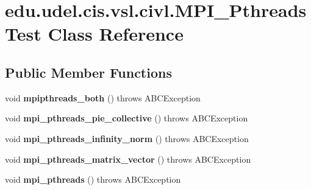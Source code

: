\hypertarget{classedu_1_1udel_1_1cis_1_1vsl_1_1civl_1_1MPI__PthreadsTest}{}\section{edu.\+udel.\+cis.\+vsl.\+civl.\+M\+P\+I\+\_\+\+Pthreads\+Test Class Reference}
\label{classedu_1_1udel_1_1cis_1_1vsl_1_1civl_1_1MPI__PthreadsTest}
\subsection*{Public Member Functions}
\begin{DoxyCompactItemize}
\item 
\hypertarget{classedu_1_1udel_1_1cis_1_1vsl_1_1civl_1_1MPI__PthreadsTest_aefea12f1eb79b9b60e9c1efc56e483ac}{}void {\bfseries mpipthreads\+\_\+both} ()  throws A\+B\+C\+Exception \label{classedu_1_1udel_1_1cis_1_1vsl_1_1civl_1_1MPI__PthreadsTest_aefea12f1eb79b9b60e9c1efc56e483ac}

\item 
\hypertarget{classedu_1_1udel_1_1cis_1_1vsl_1_1civl_1_1MPI__PthreadsTest_a29e435ffef9eee64615ddf6186b0dad7}{}void {\bfseries mpi\+\_\+pthreads\+\_\+pie\+\_\+collective} ()  throws A\+B\+C\+Exception \label{classedu_1_1udel_1_1cis_1_1vsl_1_1civl_1_1MPI__PthreadsTest_a29e435ffef9eee64615ddf6186b0dad7}

\item 
\hypertarget{classedu_1_1udel_1_1cis_1_1vsl_1_1civl_1_1MPI__PthreadsTest_a4499b0a491c036a997f3553156a49e51}{}void {\bfseries mpi\+\_\+pthreads\+\_\+infinity\+\_\+norm} ()  throws A\+B\+C\+Exception \label{classedu_1_1udel_1_1cis_1_1vsl_1_1civl_1_1MPI__PthreadsTest_a4499b0a491c036a997f3553156a49e51}

\item 
\hypertarget{classedu_1_1udel_1_1cis_1_1vsl_1_1civl_1_1MPI__PthreadsTest_a4d7365f40b5aff99f3ba4631029c2549}{}void {\bfseries mpi\+\_\+pthreads\+\_\+matrix\+\_\+vector} ()  throws A\+B\+C\+Exception \label{classedu_1_1udel_1_1cis_1_1vsl_1_1civl_1_1MPI__PthreadsTest_a4d7365f40b5aff99f3ba4631029c2549}

\item 
\hypertarget{classedu_1_1udel_1_1cis_1_1vsl_1_1civl_1_1MPI__PthreadsTest_a67139e0a9f3ec903968c8f8afd298894}{}void {\bfseries mpi\+\_\+pthreads} ()  throws A\+B\+C\+Exception \label{classedu_1_1udel_1_1cis_1_1vsl_1_1civl_1_1MPI__PthreadsTest_a67139e0a9f3ec903968c8f8afd298894}


\end{DoxyCompactItemize}
